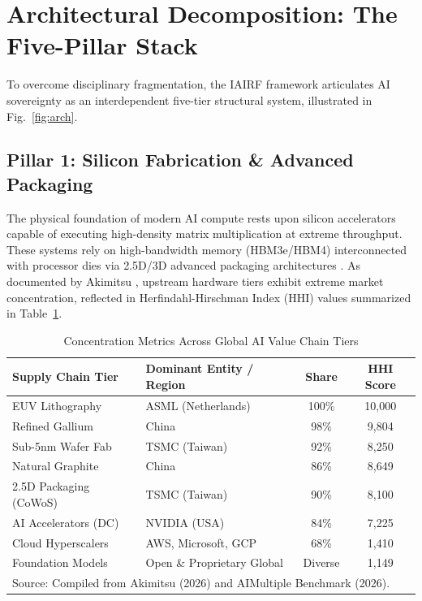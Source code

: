 \documentclass[conference,a4paper]{IEEEtran}
\begin{document}
\section{Architectural Decomposition: The Five-Pillar Stack}
To overcome disciplinary fragmentation, the IAIRF framework articulates AI sovereignty as an interdependent five-tier structural system, illustrated in Fig.~\ref{fig:arch}.

\subsection{Pillar 1: Silicon Fabrication \& Advanced Packaging}
The physical foundation of modern AI compute rests upon silicon accelerators capable of executing high-density matrix multiplication at extreme throughput. These systems rely on high-bandwidth memory (HBM3e/HBM4) interconnected with processor dies via 2.5D/3D advanced packaging architectures \cite{aimultiple2026chips}. As documented by Akimitsu \cite{akimitsu2026supply}, upstream hardware tiers exhibit extreme market concentration, reflected in Herfindahl-Hirschman Index (HHI) values summarized in Table~\ref{tab:hhi}.

\begin{table}[htbp]
\caption{Concentration Metrics Across Global AI Value Chain Tiers}
\begin{center}
\begin{tabularx}{\columnwidth}{lXcc}
\toprule
\textbf{Supply Chain Tier} & \textbf{Dominant Entity / Region} & \textbf{Share} & \textbf{HHI Score} \\
\midrule
EUV Lithography & ASML (Netherlands) & 100\% & 10,000 \\
Refined Gallium & China & 98\% & 9,804 \\
Sub-5nm Wafer Fab & TSMC (Taiwan) & 92\% & 8,250 \\
Natural Graphite & China & 86\% & 8,649 \\
2.5D Packaging (CoWoS) & TSMC (Taiwan) & 90\% & 8,100 \\
AI Accelerators (DC) & NVIDIA (USA) & 84\% & 7,225 \\
Cloud Hyperscalers & AWS, Microsoft, GCP & 68\% & 1,410 \\
Foundation Models & Open \& Proprietary Global & Diverse & 1,149 \\
\bottomrule
\multicolumn{4}{l}{\footnotesize Source: Compiled from Akimitsu (2026) and AIMultiple Benchmark (2026).}
\end{tabularx}
\label{tab:hhi}
\end{center}
\end{table}
\end{document}
